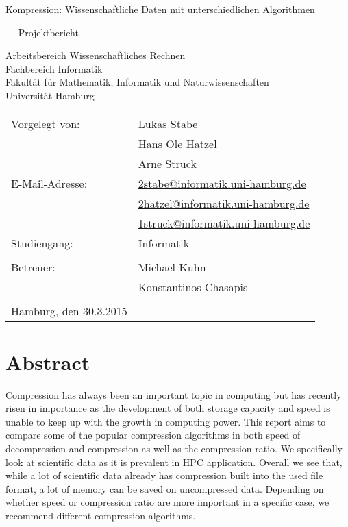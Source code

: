\documentclass[
	12pt,
	a4paper,
	BCOR10mm,
	DIV14,
	listof=totoc,
	bibliography=totoc,
	headsepline
]{scrreprt}
\begin{document}
\begin{titlepage}
	\begin{center}
		{\titlefont\huge Kompression: Wissenschaftliche Daten mit unterschiedlichen Algorithmen \par}

		\bigskip
		\bigskip

		{\titlefont\Large --- Projektbericht ---\par}

		\bigskip
		\bigskip

		{\large Arbeitsbereich Wissenschaftliches Rechnen\\
		Fachbereich Informatik\\
		Fakultät für Mathematik, Informatik und Naturwissenschaften\\
		Universität Hamburg\par}
	\end{center}

	\vfill

	{\large \begin{tabular}{ll}
		Vorgelegt von: & Lukas Stabe \\
			& Hans Ole Hatzel \\
			& Arne Struck \\
		E-Mail-Adresse:
			& \href{mailto:2stabe@informatik.uni-hamburg.de} {2stabe@informatik.uni-hamburg.de} \\
			& \href{mailto:2hatzel@informatik.uni-hamburg.de}{2hatzel@informatik.uni-hamburg.de} \\
			& \href{mailto:1struck@informatik.uni-hamburg.de}{1struck@informatik.uni-hamburg.de} \\
		Studiengang: & Informatik \\
		\\
		Betreuer: & Michael Kuhn \\
			& Konstantinos Chasapis \\
		\\
		Hamburg, den 30.3.2015
	\end{tabular}\par}
\end{titlepage}

\chapter*{Abstract}
Compression has always been an important topic in computing but has recently risen in importance as the development of both storage capacity and speed is unable to keep up with the growth in computing power.
This report aims to compare some of the popular compression algorithms in both speed of decompression and compression as well as the compression ratio. We specifically look at scientific data as it is prevalent in HPC application.
Overall we see that, while a lot of scientific data already has compression built into the used file format, a lot of memory can be saved on uncompressed data.
Depending on whether speed or compression ratio are more important in a specific case, we recommend different compression algorithms.
\thispagestyle{empty}
\end{document}

